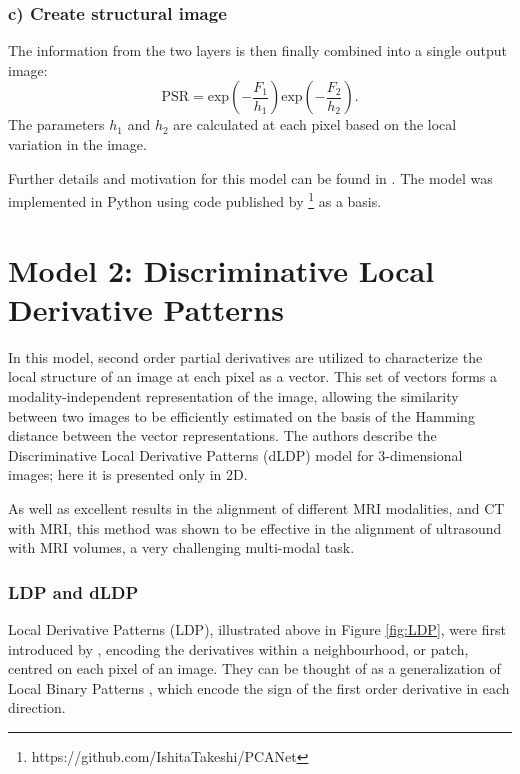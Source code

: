 \documentclass{report}
\begin{document}
\subsubsection{c) Create structural image}
The information from the two layers is then finally combined into a single output image:
\[
\text{PSR} = \text{exp}(-\frac{F_1}{h_1})\text{exp}(-\frac{F_2}{h_2}).
\]
The parameters $h_1$ and $h_2$ are calculated at each pixel based on the local variation in the image.

Further details and motivation for this model can be found in \cite{zhu2018pcanet}. The model was implemented in Python using code published by \citeauthor{takeshi2019pcanet} \footnote{https://github.com/IshitaTakeshi/PCANet} as a basis.

\section{Model 2: Discriminative Local Derivative Patterns}
\label{sec:model2}
In this model, second order partial derivatives are utilized to characterize the local structure of an image at each pixel as a vector. This set of vectors forms a modality-independent representation of the image, allowing the similarity between two images to be efficiently estimated on the basis of the Hamming distance between the vector representations. The authors \citep{jiang2017fast} describe the Discriminative Local Derivative Patterns (dLDP) model for 3-dimensional images; here it is presented only in 2D.

As well as excellent results in the alignment of different MRI modalities, and CT with MRI, this method was shown to be effective in the alignment of ultrasound with MRI volumes, a very challenging multi-modal task.

\subsubsection{LDP and dLDP}
Local Derivative Patterns (LDP), illustrated above in Figure \ref{fig:LDP}, were first introduced by \cite{zhang2009local}, encoding the derivatives within a neighbourhood, or patch, centred on each pixel of an image. They can be thought of as a generalization of Local Binary Patterns \citep{ojala2002multiresolution}, which encode the sign of the first order derivative in each direction. 
\end{document}
